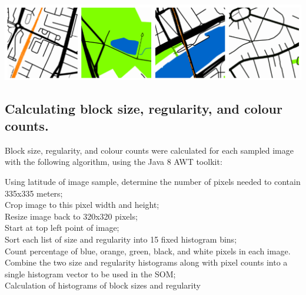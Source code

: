 \documentclass{nature}
\makeatletter
\renewenvironment*{figure}{\@float{figure}}{\end@float}
\makeatother
\begin{document}
\begin{methods}
\begin{figure}
    \centering    
 \includegraphics[scale=0.8]{Images/SampleTraining.png}   
\caption{\bf Four sample Google Maps training data images (from Paris, France)\cite{GoogleStatic2017}.}    
 \label{fig:maps}  
\end{figure} 


\subsection{Calculating block size, regularity, and colour counts.}\label{methodscalc}

Block size, regularity, and colour counts were calculated for each sampled image with the following algorithm, using the Java 8 AWT toolkit\cite{Oracle2018}:

\begin{algorithm}[H]
\SetAlgoLined
{}
 Using latitude of image sample, determine the number of pixels needed to contain 335x335 meters;\\
 Crop image to this pixel width and height;\\
 Resize image back to 320x320 pixels;\\
 Start at top left point of image;\\
 Sort each list of size and regularity into 15 fixed histogram bins;\\
 Count percentage of blue, orange, green, black, and white pixels in each image.\\
 Combine the two size and regularity histograms along with pixel counts into a single histogram vector to be used in the SOM;\\
 \caption{Calculation of histograms of block sizes and regularity}
\end{algorithm}


\end{methods}
\end{document}
